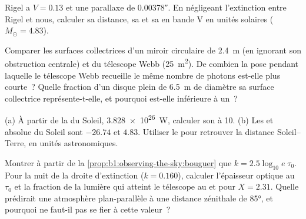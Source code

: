 \begin{exercise}[$\star\star$]\label{exo:b1:observing-the-sky:7}
Rigel a $V = 0.13$ et une parallaxe de \ang{;;0.00378}. En négligeant
l'extinction entre Rigel et nous, calculer sa distance, sa  et
sa  en bande V en unités solaires ($M_\odot = 4.83$).
\end{exercise}

\begin{exercise}[$\star\star$]\label{exo:b1:observing-the-sky:8}
Comparer les surfaces collectrices d'un miroir circulaire de \qty{2.4}{m} (en
ignorant son obstruction centrale) et du télescope Webb (\qty{25}{m^2}). De
combien la pose pendant laquelle le télescope Webb recueille le même nombre de
photons est-elle plus courte~? Quelle fraction d'un disque plein de
\qty{6.5}{m} de diamètre sa surface collectrice représente-t-elle, et pourquoi
est-elle inférieure à un~?
\end{exercise}

\begin{exercise}[$\star\star$]\label{exo:b1:observing-the-sky:9}
(a) À partir de la  du Soleil, \qty{3.828e26}{W}, calculer son  à
\qty{10}{\parsec}. (b) Les  et absolue du Soleil sont
$-26.74$ et $4.83$. Utiliser le  pour retrouver la distance
Soleil--Terre, en unités astronomiques.
\end{exercise}

\begin{exercise}[$\star\star\star$]\label{exo:b1:observing-the-sky:10}
Montrer à partir de la \cref{prop:b1:observing-the-sky:bouguer} que $k =
2.5\log_{10}e\;\tau_0$. Pour la nuit de la droite d'extinction ($k =
\num{0.160}$), calculer l'épaisseur optique au  $\tau_0$ et la fraction de
la lumière qui atteint le télescope au  et pour $X = 2.31$. Quelle  prédirait une atmosphère plan-parallèle à une distance zénithale de
\ang{85}, et pourquoi ne faut-il pas se fier à cette valeur~?
\end{exercise}

